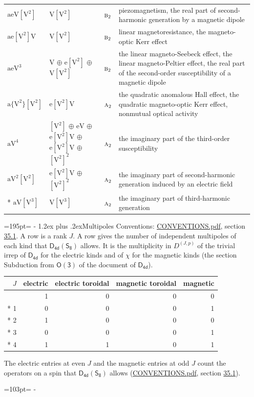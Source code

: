 \documentclass[10pt,a4paper]{article}
\makeatletter
\renewcommand\section{\@startsection{section}{1}{\z@}{-3ex plus -1ex minus -.2ex}%
  {1.2ex plus .2ex}{\normalfont\large\sffamily\bfseries\color{parttitle}}}
\newcommand{\needspace}[1]{\par\penalty-100\begingroup\dimen0=#1\relax\dimen2=\pagegoal
  \advance\dimen2-\pagetotal\ifdim\dimen0>\dimen2\relax\ifdim\dimen2>0pt\vfil\break\fi\fi
  \endgroup}
\numberwithin{equation}{section}
\newcommand{\grp}[1]{\mathsf{#1}}
\newcommand{\irr}[1]{\text{\normalfont\scshape #1}}
\newcommand{\irrJp}[2]{D^{(#1,#2)}}
\newcommand{\jahn}[1]{\mathrm{#1}}
\newlength{\fillwidth}\newlength{\cellwidth}\newlength{\colwidth}
\makeatother
\begin{document}
{\begin{longtable}{@{}lll>{\RaggedRight\arraybackslash}p{\fillwidth}@{}}
$\jahn{aeV[V^{2}]}$ & $\jahn{V[V^{2}]}$ & $\irr{b}_{2}$ & piezomagnetism, the real part of second-harmonic generation by a magnetic dipole\\
$\jahn{ae[V^{2}]V}$ & $\jahn{V[V^{2}]}$ & $\irr{b}_{2}$ & linear magnetoresistance, the magneto-optic Kerr effect\\
$\jahn{aeV^{3}}$ & $\jahn{V}$ $\oplus$ $\jahn{e[V^{2}]}$ $\oplus$ $\jahn{V[V^{2}]}$ & $\irr{b}_{2}$ & the linear magneto-Seebeck effect, the linear magneto-Peltier effect, the real part of the second-order susceptibility of a magnetic dipole\\
$\jahn{a\{V^{2}\}[V^{2}]}$ & $\jahn{e[V^{2}]V}$ & $\irr{a}_{2}$ & the quadratic anomalous Hall effect, the quadratic magneto-optic Kerr effect, nonmutual optical activity\\
$\jahn{aV^{4}}$ & $\jahn{[V^{2}]}$ $\oplus$ $\jahn{eV}$ $\oplus$ $\jahn{e[V^{2}]V}$ $\oplus$ $\jahn{e[V^{2}]V}$ $\oplus$ $\jahn{[V^{2}]^{2}}$ & $\irr{a}_{2}$ & the imaginary part of the third-order susceptibility\\
$\jahn{aV^{2}[V^{2}]}$ & $\jahn{e[V^{2}]V}$ $\oplus$ $\jahn{[V^{2}]^{2}}$ & $\irr{a}_{2}$ & the imaginary part of second-harmonic generation induced by an electric field\\*
$\jahn{aV[V^{3}]}$ & $\jahn{V[V^{3}]}$ & $\irr{a}_{2}$ & the imaginary part of third-harmonic generation\\
\bottomrule\end{longtable}}
\needspace{195pt}
\section{Multipoles}\label{s:multipoles}
Conventions: \href{../../CONVENTIONS.pdf}{CONVENTIONS.pdf}, section \href{../../CONVENTIONS.pdf\#conv.35.1}{35.1}.
A row is a rank $J$. \label{n:head.multipole.electric}\label{n:head.multipole.electric.toroidal}\label{n:head.multipole.magnetic.toroidal}\label{n:head.multipole.magnetic}A row gives the number of independent multipoles of each kind that $\grp{D_{4d}}(\grp{S_{8}})$ allows. It is the multiplicity in $\irrJp{J}{p}$ of the trivial irrep of $\grp{D_{4d}}$ for the electric kinds and of $\chi$ for the magnetic kinds (the section Subduction from $\grp{O(3)}$ of the document of \href{../../../rotation/data/pdf/D4d.pdf}{$\grp{D_{4d}}$}).
{\small\begin{longtable}{@{}rrrrr@{}}\toprule
$J$ & electric & electric toroidal & magnetic toroidal & magnetic\\\midrule\endhead
\bottomrule\endfoot\endlastfoot
0 & 1 & 0 & 0 & 0\\*
1 & 0 & 0 & 0 & 1\\*
2 & 1 & 0 & 0 & 0\\*
3 & 0 & 0 & 0 & 1\\*
4 & 1 & 1 & 0 & 1\\
\bottomrule\end{longtable}}
The electric entries at even $J$ and the magnetic entries at odd $J$ count the operators on a spin that $\grp{D_{4d}}(\grp{S_{8}})$ allows (\href{../../CONVENTIONS.pdf}{CONVENTIONS.pdf}, section \href{../../CONVENTIONS.pdf\#conv.35.1}{35.1}).
\needspace{103pt}
\end{document}
